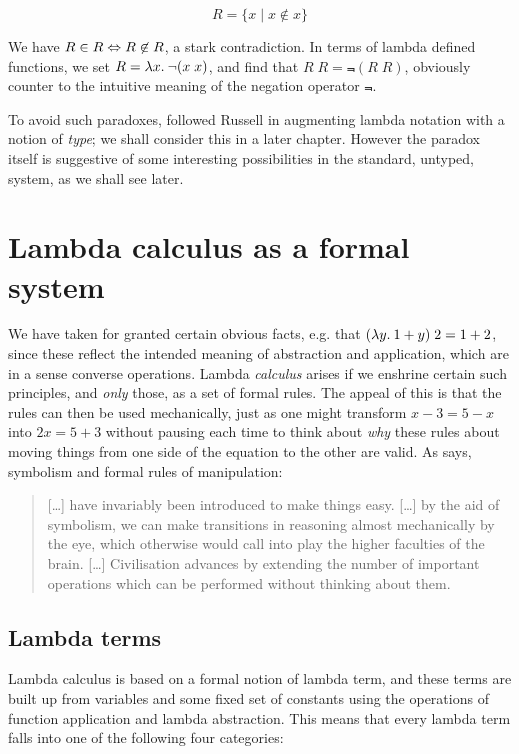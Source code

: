 $$ R = \{x \mid x \not\in x\} $$

We have $R \in R \Leftrightarrow R \not\in R$, a stark contradiction. In terms of
lambda defined functions, we set $R = \lambda x.\: \neg (x\; x)$, and find that
$R\; R = \Not(R\; R)$, obviously counter to the intuitive meaning of the
negation operator $\Not$.

To avoid such paradoxes,  followed Russell in augmenting
lambda notation with a notion of {\em type}; we shall consider this in a later
chapter. However the paradox itself is suggestive of some interesting
possibilities in the standard, untyped, system, as we shall see later.

\section{Lambda calculus as a formal system}

We have taken for granted certain obvious facts, e.g. that $(\lambda y.\: 1 + y)\;2
= 1 + 2$, since these reflect the intended meaning of abstraction and
application, which are in a sense converse operations. Lambda {\em calculus}
arises if we enshrine certain such principles, and {\em only} those, as a set
of formal rules. The appeal of this is that the rules can then be used
mechanically, just as one might transform $x - 3 = 5 - x$ into $2 x = 5 + 3$
without pausing each time to think about {\em why} these rules about moving
things from one side of the equation to the other are valid. As
 says, symbolism and formal rules of manipulation:

\begin{quote}
[\ldots] have invariably been introduced to make things easy. [\ldots] by
the aid of symbolism, we can make transitions in reasoning almost mechanically
by the eye, which otherwise would call into play the higher faculties of the
brain. [\ldots] Civilisation advances by extending the number of important
operations which can be performed without thinking about them.
\end{quote}

\subsection{Lambda terms}

Lambda calculus is based on a formal notion of lambda term, and these terms are
built up from variables and some fixed set of constants using the operations of
function application and lambda abstraction. This means that every lambda term
falls into one of the following four categories:

